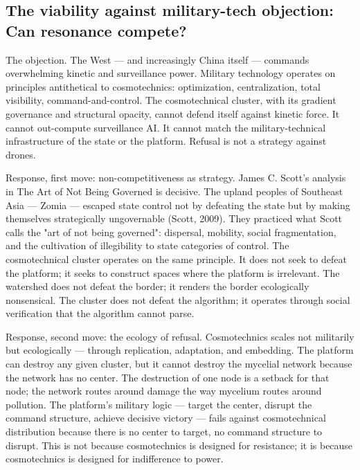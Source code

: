 \subsection{The viability against military-tech objection: Can resonance compete?}

The objection. The West — and increasingly China itself — commands overwhelming kinetic and surveillance power. Military technology operates on principles antithetical to cosmotechnics: optimization, centralization, total visibility, command-and-control. The cosmotechnical cluster, with its gradient governance and structural opacity, cannot defend itself against kinetic force. It cannot out-compute surveillance AI. It cannot match the military-technical infrastructure of the state or the platform. Refusal is not a strategy against drones.

Response, first move: non-competitiveness as strategy. James C. Scott's analysis in The Art of Not Being Governed is decisive. The upland peoples of Southeast Asia — Zomia — escaped state control not by defeating the state but by making themselves strategically ungovernable (Scott, 2009). They practiced what Scott calls the "art of not being governed": dispersal, mobility, social fragmentation, and the cultivation of illegibility to state categories of control. The cosmotechnical cluster operates on the same principle. It does not seek to defeat the platform; it seeks to construct spaces where the platform is irrelevant. The watershed does not defeat the border; it renders the border ecologically nonsensical. The cluster does not defeat the algorithm; it operates through social verification that the algorithm cannot parse.

Response, second move: the ecology of refusal. Cosmotechnics scales not militarily but ecologically — through replication, adaptation, and embedding. The platform can destroy any given cluster, but it cannot destroy the mycelial network because the network has no center. The destruction of one node is a setback for that node; the network routes around damage the way mycelium routes around pollution. The platform's military logic — target the center, disrupt the command structure, achieve decisive victory — fails against cosmotechnical distribution because there is no center to target, no command structure to disrupt. This is not because cosmotechnics is designed for resistance; it is because cosmotechnics is designed for indifference to power.

